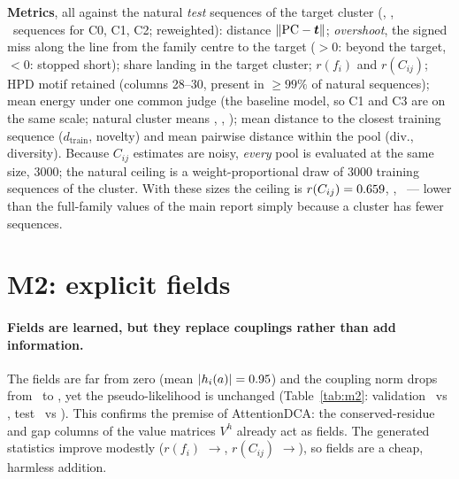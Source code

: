 \textbf{Metrics}, all against the natural \emph{test} sequences of the target cluster
(\NatNA, \NatNB, \NatNC\ sequences for C0, C1, C2; reweighted):
distance $\|\mathrm{PC}-\bm t\|$; \emph{overshoot}, the signed miss along the line from the family centre to
the target ($>0$: beyond the target, $<0$: stopped short); share landing in the target cluster;
$r(f_i)$ and $r(C_{ij})$; HPD motif retained (columns 28--30, present in $\ge99\%$ of natural
sequences); mean energy under one common judge (the baseline model, so C1 and C3 are on the same
scale; natural cluster means \NatEA, \NatEB, \NatEC); mean distance to the closest training
sequence ($d_\text{train}$, novelty) and mean pairwise distance within the pool (div., diversity).
Because $C_{ij}$ estimates are noisy, \emph{every} pool is evaluated at the same size, $3000$; the
natural ceiling is a weight-proportional draw of $3000$ training sequences of the cluster. With
these sizes the ceiling is $r(C_{ij})=0.659$, \CeilB, \CeilC\ --- lower than the full-family
values of the main report simply because a cluster has fewer sequences.

\section{M2: explicit fields}\label{sec:m2}
\begin{table}[h]\centering\small

\caption{Fields versus no fields, same training protocol. NLPL in nats per sequence; $r$ and slope of
the generated statistics against the natural test set (full family); shares by nearest cluster
centre; $\Delta F_{C0}=-\ln(s^\text{gen}_{C0}/s^\text{nat}_{C0})$.}
\label{tab:m2}
\end{table}

\paragraph{Fields are learned, but they replace couplings rather than add information.} The fields
are far from zero (mean $|h_i(a)|=0.95$) and the coupling norm drops from \JfrobBase\ to
\JfrobMtwo, yet the pseudo-likelihood is unchanged (Table~\ref{tab:m2}: validation \ValBase\ vs
\ValMtwo, test \NLPLtestBase\ vs \NLPLtestMtwo). This confirms the premise of AttentionDCA: the
conserved-residue and gap columns of the value matrices $V^h$ already act as fields. The generated
statistics improve modestly ($r(f_i)$ \rfBase$\to$\rfMtwo, $r(C_{ij})$ \rCBase$\to$\rCMtwo), so fields
are a cheap, harmless addition.

